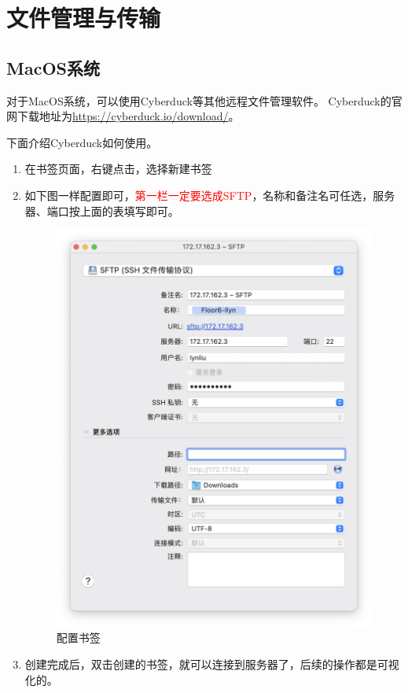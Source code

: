 \documentclass{article}
\def\mark{\textcolor{red}}
\begin{document}
\section{文件管理与传输}
\subsection{MacOS系统}
对于MacOS系统，可以使用Cyberduck等其他远程文件管理软件。
Cyberduck的官网下载地址为\url{https://cyberduck.io/download/}。

下面介绍Cyberduck如何使用。
\begin{enumerate}
    \item 在书签页面，右键点击，选择新建书签
    \item 如下图一样配置即可，\mark{第一栏一定要选成SFTP}，名称和备注名可任选，服务器、端口按上面的表填写即可。
    \begin{figure}[H]
        \centering
        \includegraphics[scale = 0.5]{figs/4.png}
        \caption{配置书签}
    \end{figure}
    \item 创建完成后，双击创建的书签，就可以连接到服务器了，后续的操作都是可视化的。
\end{enumerate}
\end{document}
